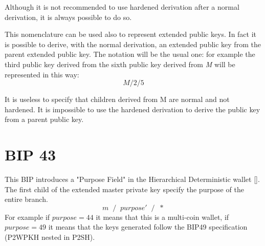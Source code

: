 \begin{remark}
	Although it is not recommended to use hardened derivation after a normal derivation, it is always possible to do so.
\end{remark}
This nomenclature can be used also to represent extended public keys. In fact it is possible to derive, with the normal derivation, an extended public key from the parent extended public key. The notation will be the usual one: for example the third public key derived from the sixth public key derived from \textit{M} will be represented in this way:
\begin{equation*}
M /2/5
\end{equation*}

\begin{remark}
It is useless to specify that children derived from M are normal and not hardened. It is impossible to use the hardened derivation to derive the public key from a parent public key.
\end{remark}

  
\section{BIP 43}
This BIP introduces a "Purpose Field" in the Hierarchical Deterministic wallet [\cite{4}]. The first child of the extended master private key specify the purpose of the entire branch.
\begin{equation*}
m\; \;/\;\; purpose'\;\; /\;\; *
\end{equation*}
For example if $purpose=44$ it means that this is a multi-coin wallet, if $purpose=49$ it means that the keys generated follow the BIP49 specification (P2WPKH nested in P2SH).

